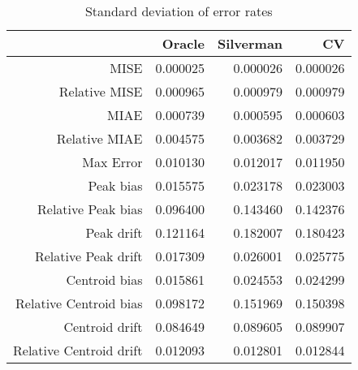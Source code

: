 \begin{table}[ht]
\centering
\begin{tabular}{rrrr}
  \hline
 & Oracle & Silverman & CV \\ 
  \hline
MISE & 0.000025 & 0.000026 & 0.000026 \\ 
  Relative MISE & 0.000965 & 0.000979 & 0.000979 \\ 
  MIAE & 0.000739 & 0.000595 & 0.000603 \\ 
  Relative MIAE & 0.004575 & 0.003682 & 0.003729 \\ 
  Max Error & 0.010130 & 0.012017 & 0.011950 \\ 
  Peak bias & 0.015575 & 0.023178 & 0.023003 \\ 
  Relative Peak bias & 0.096400 & 0.143460 & 0.142376 \\ 
  Peak drift & 0.121164 & 0.182007 & 0.180423 \\ 
  Relative Peak drift & 0.017309 & 0.026001 & 0.025775 \\ 
  Centroid bias & 0.015861 & 0.024553 & 0.024299 \\ 
  Relative Centroid bias & 0.098172 & 0.151969 & 0.150398 \\ 
  Centroid drift & 0.084649 & 0.089605 & 0.089907 \\ 
  Relative Centroid drift & 0.012093 & 0.012801 & 0.012844 \\ 
   \hline
\end{tabular}
\caption{Standard deviation of error rates} 
\label{tbl:stddev_error_rates}
\end{table}
